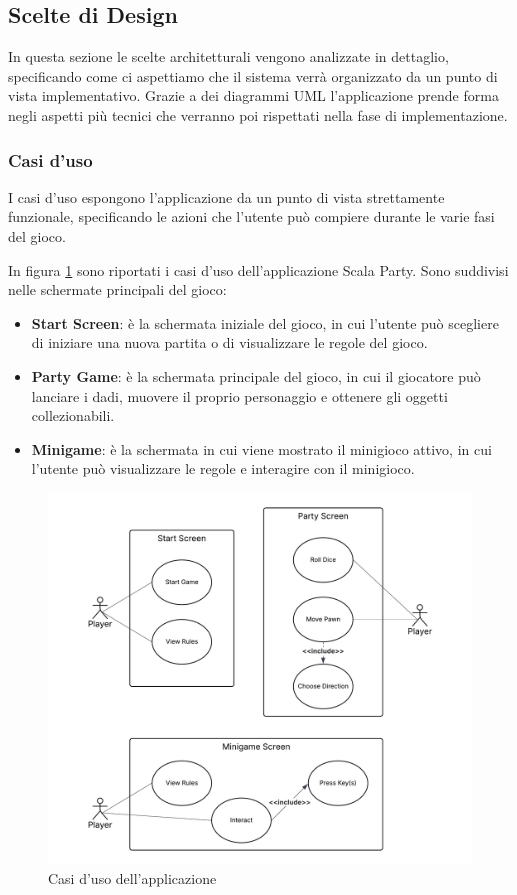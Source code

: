 \subsection{Scelte di Design} \label{sec:design-choices}
In questa sezione le scelte architetturali vengono analizzate in dettaglio, 
specificando come ci aspettiamo che il sistema verrà organizzato da un punto di vista
implementativo. Grazie a dei diagrammi UML l'applicazione prende forma negli aspetti più
tecnici che verranno poi rispettati nella fase di implementazione.

\subsubsection{Casi d'uso} \label{sec:design-choices:use-cases}
I casi d'uso espongono l'applicazione da un punto di vista strettamente funzionale,
specificando le azioni che l'utente può compiere durante le varie fasi del gioco.

In figura \ref{fig:use-cases} sono riportati i casi d'uso dell'applicazione Scala Party.
Sono suddivisi nelle schermate principali del gioco:
\begin{itemize}
    \item \textbf{Start Screen}: è la schermata iniziale del gioco, in cui l'utente
    può scegliere di iniziare una nuova partita o di visualizzare le regole del gioco.
    \item \textbf{Party Game}: è la schermata principale del gioco, in cui il giocatore
    può lanciare i dadi, muovere il proprio personaggio e ottenere gli oggetti collezionabili.
    \item \textbf{Minigame}: è la schermata in cui viene mostrato il minigioco
    attivo, in cui l'utente può visualizzare le regole e interagire con il minigioco.
\end{itemize}

\begin{figure}[ht!]
    \centering
    \includegraphics[width=\textwidth]{figures/use-cases.png}
    \caption{Casi d'uso dell'applicazione}
    \label{fig:use-cases}
\end{figure}

